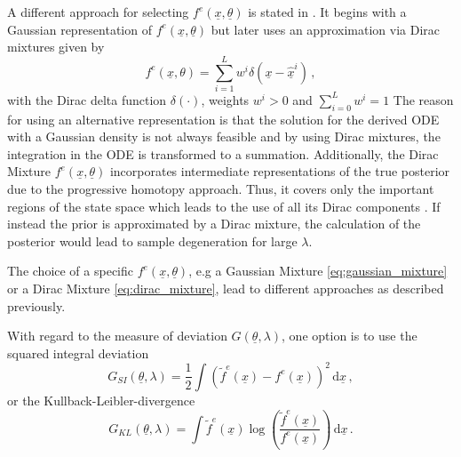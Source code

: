 \documentclass[a4paper]{IEEEtran}
\begin{document}
A different approach for selecting $f^e(\underline{x}, \underline{\theta})$ is stated in \cite{hanebeck2012a}. It begins with a Gaussian representation of $f^e(\underline{x}, \underline{\theta})$ but later uses an approximation via Dirac mixtures given by 
\begin{equation}
    f^{e}(\underline{x}, \theta) = \sum^{L}_{i=1} w^{i} \delta(\underline{x}-\hat{\underline{x}}^{i}) \,,
    \label{eq:dirac_mixture}
\end{equation}
with the Dirac delta function $\delta( \cdot )$, weights $w^{i} > 0$ and $\sum^{L}_{i=0} w^{i} = 1$
The reason for using an alternative representation is that the solution for the derived ODE with a Gaussian density is not always feasible and by using Dirac mixtures, the integration in the ODE is transformed to a summation. Additionally, the Dirac Mixture $f^e(\underline{x}, \underline{\theta})$ 
incorporates intermediate representations of the true posterior due to the progressive homotopy approach. 
Thus, it covers only the important regions of the state space which leads to the use of all its Dirac components \cite{hanebeck2012a}. If instead the prior is approximated by a Dirac mixture, the calculation of the posterior would lead to sample degeneration for large $\lambda$.

The choice of a specific $f^e(\underline{x}, \underline{\theta})$, e.g a Gaussian Mixture \eqref{eq:gaussian_mixture} or a Dirac Mixture \eqref{eq:dirac_mixture}, lead to different approaches as described previously.

With regard to the measure of deviation $G(\underline{\theta},\lambda)$, one option is to use the squared integral deviation
\begin{equation}
    G_{SI}(\underline{\theta}, \lambda) = \frac{1}{2} \int (\tilde{f}^e(\underline{x})-f^{e}(\underline{x}))^2 \, \mathrm{d} \underline{x}\,,
    \label{eq:squared_integral_dev}
\end{equation}
or the Kullback-Leibler-divergence
\begin{equation}
    G_{KL}(\underline{\theta}, \lambda) = \int \tilde{f}^e(\underline{x}) \log\left(\frac{\tilde{f}^e(\underline{x})}{f^{e}(\underline{x})} \right) \, \mathrm{d} \underline{x} \,.
    \label{eq:kb_div}
\end{equation}
\end{document}
